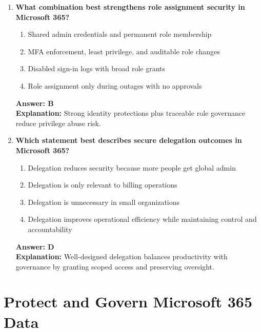 \documentclass[10pt]{article}
\begin{document}
\begin{enumerate}[leftmargin=*]
\item \textbf{What combination best strengthens role assignment security in Microsoft 365?}
\begin{enumerate}[label=\Alph*.]
  \item Shared admin credentials and permanent role membership
  \item MFA enforcement, least privilege, and auditable role changes
  \item Disabled sign-in logs with broad role grants
  \item Role assignment only during outages with no approvals
\end{enumerate}
\textbf{Answer: B}\\
\textbf{Explanation:} Strong identity protections plus traceable role governance reduce privilege abuse risk.

\item \textbf{Which statement best describes secure delegation outcomes in Microsoft 365?}
\begin{enumerate}[label=\Alph*.]
  \item Delegation reduces security because more people get global admin
  \item Delegation is only relevant to billing operations
  \item Delegation is unnecessary in small organizations
  \item Delegation improves operational efficiency while maintaining control and accountability
\end{enumerate}
\textbf{Answer: D}\\
\textbf{Explanation:} Well-designed delegation balances productivity with governance by granting scoped access and preserving oversight.

\end{enumerate}
\clearpage
\section{Protect and Govern Microsoft 365 Data}
\clearpage
\end{document}

